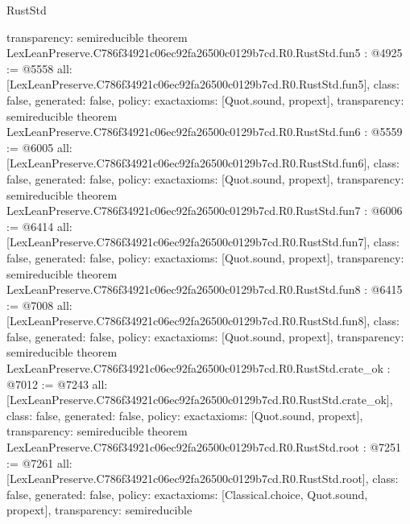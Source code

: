 \begin{lexlean}{RustStd}
\begin{coremodule}
{  transparency: semireducible
}
theorem LexLeanPreserve.C786f34921c06ec92fa26500c0129b7cd.R0.RustStd.fun5 : @4925 := @5558 {
  all: [LexLeanPreserve.C786f34921c06ec92fa26500c0129b7cd.R0.RustStd.fun5],
  class: false,
  generated: false,
  policy: exact{axioms: [Quot.sound, propext]},
  transparency: semireducible
}
theorem LexLeanPreserve.C786f34921c06ec92fa26500c0129b7cd.R0.RustStd.fun6 : @5559 := @6005 {
  all: [LexLeanPreserve.C786f34921c06ec92fa26500c0129b7cd.R0.RustStd.fun6],
  class: false,
  generated: false,
  policy: exact{axioms: [Quot.sound, propext]},
  transparency: semireducible
}
theorem LexLeanPreserve.C786f34921c06ec92fa26500c0129b7cd.R0.RustStd.fun7 : @6006 := @6414 {
  all: [LexLeanPreserve.C786f34921c06ec92fa26500c0129b7cd.R0.RustStd.fun7],
  class: false,
  generated: false,
  policy: exact{axioms: [Quot.sound, propext]},
  transparency: semireducible
}
theorem LexLeanPreserve.C786f34921c06ec92fa26500c0129b7cd.R0.RustStd.fun8 : @6415 := @7008 {
  all: [LexLeanPreserve.C786f34921c06ec92fa26500c0129b7cd.R0.RustStd.fun8],
  class: false,
  generated: false,
  policy: exact{axioms: [Quot.sound, propext]},
  transparency: semireducible
}
theorem LexLeanPreserve.C786f34921c06ec92fa26500c0129b7cd.R0.RustStd.crate_ok : @7012 := @7243 {
  all: [LexLeanPreserve.C786f34921c06ec92fa26500c0129b7cd.R0.RustStd.crate_ok],
  class: false,
  generated: false,
  policy: exact{axioms: [Quot.sound, propext]},
  transparency: semireducible
}
theorem LexLeanPreserve.C786f34921c06ec92fa26500c0129b7cd.R0.RustStd.root : @7251 := @7261 {
  all: [LexLeanPreserve.C786f34921c06ec92fa26500c0129b7cd.R0.RustStd.root],
  class: false,
  generated: false,
  policy: exact{axioms: [Classical.choice, Quot.sound, propext]},
  transparency: semireducible
}


\end{coremodule}
\end{lexlean}
